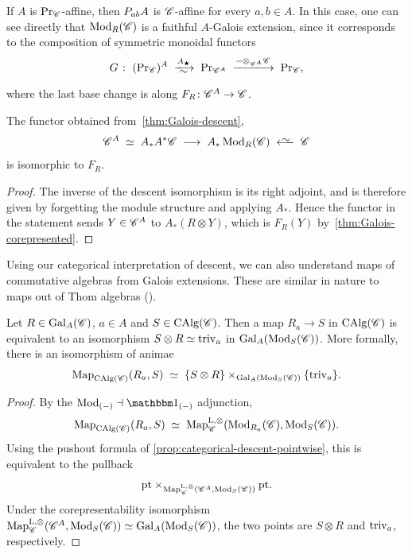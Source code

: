 \documentclass[english,svgnames,table]{article}
\begin{document}
    \begin{remark}
        If $A$ is $\operatorname{Pr}_{\mathscr{C}}$-affine, then $P_{ab} A$ is $\mathscr{C}$-affine for every $a,b \in A$. In this case, one can see directly that $\operatorname{Mod}_R(\mathscr{C})$ is a faithful $A$-Galois extension, since it corresponds to the composition of symmetric monoidal functors
        \begin{equation*}
            G \;\colon\; (\ModC)^A \;\xisotoo{A_{\scriptscriptstyle\bigstar}}\; \ModC[\cC^A] \;\xtoo{- \otimes_{\cC^A} \cC}\; \ModC,
        \end{equation*}
        where the last base change is along $F_R \colon \mathscr{C}^A \to \mathscr{C}$.
    \end{remark}

    \begin{lemma}
        The functor obtained from~\cref{thm:Galois-descent},
        \begin{equation*}
            \cC^A \;\simeq\; A_* A^* \cC \;\too\; A_* \Mod_R(\cC) \;\isogetss\; \cC
        \end{equation*}
        is isomorphic to $F_R$.
    \end{lemma}
    \begin{proof}
        The inverse of the descent isomorphism is its right adjoint, and is therefore given by forgetting the module structure and applying $A_*$. Hence the functor in the statement sends $Y\in\mathscr{C}^A$ to $A_*(R\otimes Y)$, which is $F_R(Y)$ by~\cref{thm:Galois-corepresented}.
    \end{proof}

    Using our categorical interpretation of descent, we can also understand maps of commutative algebras from Galois extensions. These are similar in nature to maps out of Thom algebras (\cite{Antolin-Barthel-2019-Thom}).
    \begin{proposition}
        Let $R \in \mathrm{Gal}_A(\mathscr{C})$, $a \in A$ and $S \in \operatorname{CAlg}(\mathscr{C})$. Then a map $R_a \to S$ in $\operatorname{CAlg}(\mathscr{C})$ is equivalent to an isomorphism $S \otimes R \simeq \mathrm{triv}_a$ in $\mathrm{Gal}_A(\operatorname{Mod}_S(\mathscr{C}))$. More formally, there is an isomorphism of animae
        \begin{equation*}
            \operatorname{Map}_{\operatorname{CAlg}(\mathscr{C})}(R_a, S) \;\simeq\; \{S \otimes R\} \times_{\mathrm{Gal}_A(\operatorname{Mod}_S(\mathscr{C}))} \{\mathrm{triv}_a\}.
        \end{equation*}
    \end{proposition}

    \begin{proof}
        By the $\Mod_{(-)} \dashv \ounit_{(-)}$ adjunction,
        \begin{equation*}
            \operatorname{Map}_{\operatorname{CAlg}(\mathscr{C})}(R_a, S) \;\simeq\; \operatorname{Map}^{\mathrm{L},\otimes}_{\mathscr{C}}(\operatorname{Mod}_{R_a}(\mathscr{C}), \operatorname{Mod}_S(\mathscr{C})).
        \end{equation*}
        Using the pushout formula of \cref{prop:categorical-descent-pointwise}, this is equivalent to the pullback
        \begin{equation*}
            \mathrm{pt} \times_{\operatorname{Map}^{\mathrm{L},\otimes}_{\mathscr{C}}(\mathscr{C}^A, \operatorname{Mod}_S(\mathscr{C}))} \mathrm{pt}.
        \end{equation*}
        Under the corepresentability isomorphism $\operatorname{Map}^{\mathrm{L},\otimes}_{\mathscr{C}}(\mathscr{C}^A,\operatorname{Mod}_S(\mathscr{C})) \simeq \mathrm{Gal}_A(\operatorname{Mod}_S(\mathscr{C}))$, the two points are $S \otimes R$ and $\mathrm{triv}_a$, respectively.
    \end{proof}
\end{document}
